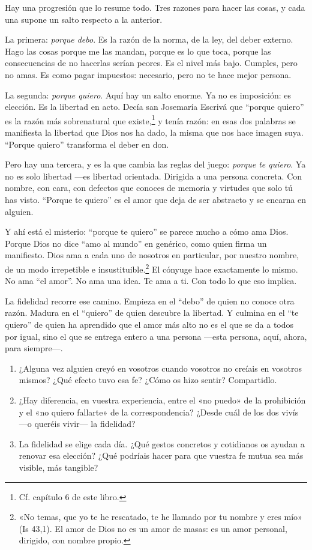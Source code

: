 Hay una progresión que lo resume todo. Tres razones para hacer las cosas, y cada una supone un salto respecto a la anterior.

La primera: \textit{porque debo}. Es la razón de la norma, de la ley, del deber externo. Hago las cosas porque me las mandan, porque es lo que toca, porque las consecuencias de no hacerlas serían peores. Es el nivel más bajo. Cumples, pero no amas. Es como pagar impuestos: necesario, pero no te hace mejor persona.

La segunda: \textit{porque quiero}. Aquí hay un salto enorme. Ya no es imposición: es elección. Es la libertad en acto. Decía san Josemaría Escrivá que ``porque quiero'' es la razón más sobrenatural que existe,\footnote{Cf. capítulo 6 de este libro.} y tenía razón: en esas dos palabras se manifiesta la libertad que Dios nos ha dado, la misma que nos hace imagen suya. ``Porque quiero'' transforma el deber en don.

Pero hay una tercera, y es la que cambia las reglas del juego: \textit{porque te quiero}. Ya no es solo libertad ---es libertad orientada. Dirigida a una persona concreta. Con nombre, con cara, con defectos que conoces de memoria y virtudes que solo tú has visto. ``Porque te quiero'' es el amor que deja de ser abstracto y se encarna en alguien.

Y ahí está el misterio: ``porque te quiero'' se parece mucho a cómo ama Dios. Porque Dios no dice ``amo al mundo'' en genérico, como quien firma un manifiesto. Dios ama a cada uno de nosotros en particular, por nuestro nombre, de un modo irrepetible e insustituible.\footnote{«No temas, que yo te he rescatado, te he llamado por tu nombre y eres mío» (Is 43,1). El amor de Dios no es un amor de masas: es un amor personal, dirigido, con nombre propio.} El cónyuge hace exactamente lo mismo. No ama ``el amor''. No ama una idea. Te ama a ti. Con todo lo que eso implica.

La fidelidad recorre ese camino. Empieza en el ``debo'' de quien no conoce otra razón. Madura en el ``quiero'' de quien descubre la libertad. Y culmina en el ``te quiero'' de quien ha aprendido que el amor más alto no es el que se da a todos por igual, sino el que se entrega entero a una persona ---esta persona, aquí, ahora, para siempre---.

\paracaminar

\begin{enumerate}
  \item ¿Alguna vez alguien creyó en vosotros cuando vosotros no creíais en vosotros mismos? ¿Qué efecto tuvo esa fe? ¿Cómo os hizo sentir? Compartidlo.

  \item ¿Hay diferencia, en vuestra experiencia, entre el «no puedo» de la prohibición y el «no quiero fallarte» de la correspondencia? ¿Desde cuál de los dos vivís ---o queréis vivir--- la fidelidad?

  \item La fidelidad se elige cada día. ¿Qué gestos concretos y cotidianos os ayudan a renovar esa elección? ¿Qué podríais hacer para que vuestra fe mutua sea más visible, más tangible?
\end{enumerate}

